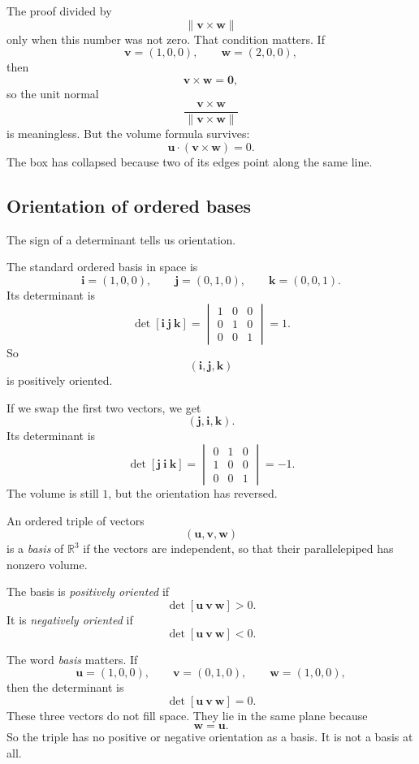 The proof divided by
\[
    \|\mathbf v\times\mathbf w\|
\]
only when this number was not zero.  That condition matters.  If
\[
    \mathbf v=(1,0,0),
    \qquad
    \mathbf w=(2,0,0),
\]
then
\[
    \mathbf v\times\mathbf w=\mathbf 0,
\]
so the unit normal
\[
    \frac{\mathbf v\times\mathbf w}{\|\mathbf v\times\mathbf w\|}
\]
is meaningless.  But the volume formula survives:
\[
    \mathbf u\cdot(\mathbf v\times\mathbf w)=0.
\]
The box has collapsed because two of its edges point along the same line.

\subsection{Orientation of ordered bases}

The sign of a determinant tells us orientation.

The standard ordered basis in space is
\[
    \mathbf i=(1,0,0),
    \qquad
    \mathbf j=(0,1,0),
    \qquad
    \mathbf k=(0,0,1).
\]
Its determinant is
\[
    \det[\mathbf i\ \mathbf j\ \mathbf k]
    =
    \begin{vmatrix}
    1&0&0\\
    0&1&0\\
    0&0&1
    \end{vmatrix}
    =
    1.
\]
So
\[
    (\mathbf i,\mathbf j,\mathbf k)
\]
is positively oriented.

If we swap the first two vectors, we get
\[
    (\mathbf j,\mathbf i,\mathbf k).
\]
Its determinant is
\[
    \det[\mathbf j\ \mathbf i\ \mathbf k]
    =
    \begin{vmatrix}
    0&1&0\\
    1&0&0\\
    0&0&1
    \end{vmatrix}
    =
    -1.
\]
The volume is still \(1\), but the orientation has reversed.

\begin{definition}
An ordered triple of vectors
\[
    (\mathbf u,\mathbf v,\mathbf w)
\]
is a \emph{basis} of \(\mathbb R^3\) if the vectors are independent, so that their
parallelepiped has nonzero volume.

The basis is \emph{positively oriented} if
\[
    \det[\mathbf u\ \mathbf v\ \mathbf w]>0.
\]
It is \emph{negatively oriented} if
\[
    \det[\mathbf u\ \mathbf v\ \mathbf w]<0.
\]
\end{definition}

The word \emph{basis} matters.  If
\[
    \mathbf u=(1,0,0),
    \qquad
    \mathbf v=(0,1,0),
    \qquad
    \mathbf w=(1,0,0),
\]
then the determinant is
\[
    \det[\mathbf u\ \mathbf v\ \mathbf w]=0.
\]
These three vectors do not fill space.  They lie in the same plane because
\[
    \mathbf w=\mathbf u.
\]
So the triple has no positive or negative orientation as a basis.  It is not a basis at all.

